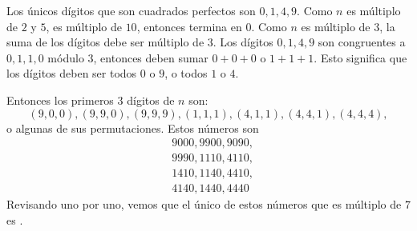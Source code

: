 Los únicos dígitos que son cuadrados perfectos son $0,1,4,9$. 
Como $n$ es múltiplo de $2$ y $5$, es múltiplo de $10$, entonces termina en $0$. 
Como $n$ es múltiplo de $3$, la suma de los dígitos debe ser múltiplo de $3$. Los dígitos $0,1,4,9$ 
son congruentes a $0,1,1,0$ módulo $3$, entonces deben sumar $0+0+0$ o $1+1+1$.
Esto significa que los dígitos deben ser todos $0$ o $9$, o todos $1$ o $4$. 

Entonces los primeros $3$ dígitos de $n$ son: 
\[(9,0,0),(9,9,0),(9,9,9),(1,1,1),(4,1,1),(4,4,1),(4,4,4),\]
o algunas de sus permutaciones. Estos números son 
\begin{align*}
&9000, 9900, 9090, \\
&9990, 1110, 4110, \\
&1410, 1140, 4410, \\
&4140, 1440, 4440
\end{align*}
Revisando uno por uno, vemos que el único de estos números 
que es múltiplo de $7$ es . 
